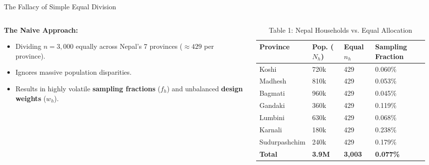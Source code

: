 \documentclass[10pt, aspectratio=169]{beamer}
\begin{document}
\begin{frame}{The Fallacy of Simple Equal Division}
    \begin{columns}
        \begin{column}{0.5\textwidth}
            \textbf{The Naive Approach:}
            \begin{itemize}
                \item Dividing $n = 3,000$ equally across Nepal's 7 provinces ($\approx 429$ per province).
                \item Ignores massive population disparities.
                \item Results in highly volatile \textbf{sampling fractions} ($f_h$) and unbalanced \textbf{design weights} ($w_h$).
              \end{itemize}
          \end{column}
          \begin{column}{0.5\textwidth}
              \begin{table}
                  \caption{Table 1: Nepal Households vs. Equal Allocation}
                  \tiny
                  \begin{tabularx}{\textwidth}{lXXX}
                      \toprule
                      \textbf{Province} & \textbf{Pop. ($N_h$)} & \textbf{Equal $n_h$} & \textbf{Sampling Fraction} \\
                      \midrule
                      Koshi & 720k & 429 & 0.060\% \\
                      Madhesh & 810k & 429 & 0.053\% \\
                      Bagmati & 960k & 429 & 0.045\% \\
                      Gandaki & 360k & 429 & 0.119\% \\
                      Lumbini & 630k & 429 & 0.068\% \\
                      Karnali & 180k & 429 & 0.238\% \\
                      Sudurpashchim & 240k & 429 & 0.179\% \\
                      \midrule
                      \textbf{Total} & \textbf{3.9M} & \textbf{3,003} & \textbf{0.077\%} \\
                      \bottomrule
                  \end{tabularx}
              \end{table}
          \end{column}
      \end{columns}
  \end{frame}
  
\end{document}

